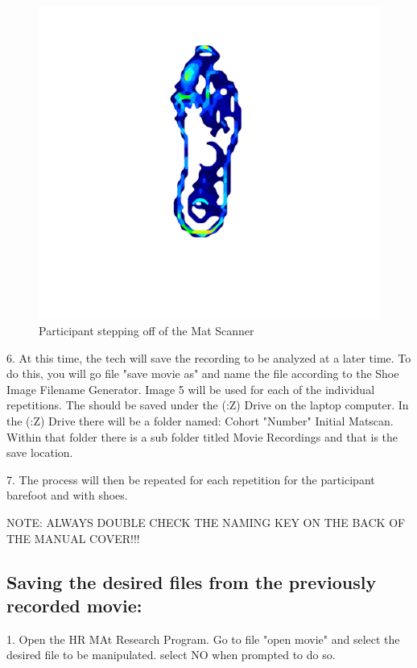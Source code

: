 \begin{figure}[!htp]
\centering
\includegraphics[scale=0.15]{Mat_shoe}
\caption{Participant stepping off of the Mat Scanner}
\label{Image 8}
\end{figure}

\newpage

6. At this time, the tech will save the recording to be analyzed at a later time. To do this, you will go file "save movie as" and name the file according to the Shoe Image Filename Generator. Image 5 will be used for each of the individual repetitions. The should be saved under the (:Z) Drive on the laptop computer. In the (:Z) Drive there will be a folder named: Cohort "Number" Initial Matscan. Within that folder there is a sub folder titled Movie Recordings and that is the save location.  

7. The process will then be repeated for each repetition for the participant barefoot and with shoes. 


NOTE: ALWAYS DOUBLE CHECK THE NAMING KEY ON THE BACK OF THE MANUAL COVER!!!


\subsection{Saving the desired files from the previously recorded movie:}

1. Open the HR MAt Research Program. Go to file "open movie" and select the desired file to be manipulated. select NO when prompted to do so. 

